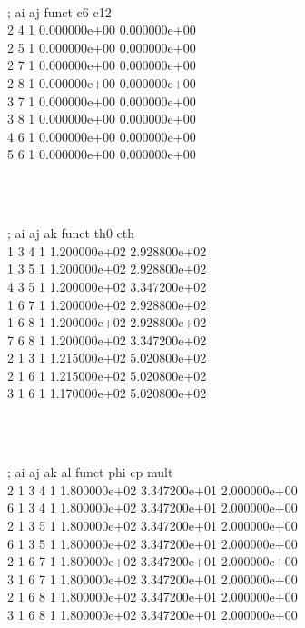 \begin{tt}
[ pairs ]\\
;  ai    aj funct           c6          c12\\
    2     4     1 0.000000e+00 0.000000e+00 \\
    2     5     1 0.000000e+00 0.000000e+00 \\
    2     7     1 0.000000e+00 0.000000e+00 \\
    2     8     1 0.000000e+00 0.000000e+00 \\
    3     7     1 0.000000e+00 0.000000e+00 \\
    3     8     1 0.000000e+00 0.000000e+00 \\
    4     6     1 0.000000e+00 0.000000e+00 \\
    5     6     1 0.000000e+00 0.000000e+00 \\
\end{tt}\\
\begin{tt}
[ angles ]\\
;  ai    aj    ak funct          th0          cth\\
    1     3     4     1 1.200000e+02 2.928800e+02 \\
    1     3     5     1 1.200000e+02 2.928800e+02 \\
    4     3     5     1 1.200000e+02 3.347200e+02 \\
    1     6     7     1 1.200000e+02 2.928800e+02 \\
    1     6     8     1 1.200000e+02 2.928800e+02 \\
    7     6     8     1 1.200000e+02 3.347200e+02 \\
    2     1     3     1 1.215000e+02 5.020800e+02 \\
    2     1     6     1 1.215000e+02 5.020800e+02 \\
    3     1     6     1 1.170000e+02 5.020800e+02 \\
\end{tt}\\
\begin{tt}
[ dihedrals ]\\
;  ai    aj    ak    al funct          phi           cp         mult\\
    2     1     3     4     1 1.800000e+02 3.347200e+01 2.000000e+00 \\
    6     1     3     4     1 1.800000e+02 3.347200e+01 2.000000e+00 \\
    2     1     3     5     1 1.800000e+02 3.347200e+01 2.000000e+00 \\
    6     1     3     5     1 1.800000e+02 3.347200e+01 2.000000e+00 \\
    2     1     6     7     1 1.800000e+02 3.347200e+01 2.000000e+00 \\
    3     1     6     7     1 1.800000e+02 3.347200e+01 2.000000e+00 \\
    2     1     6     8     1 1.800000e+02 3.347200e+01 2.000000e+00 \\
    3     1     6     8     1 1.800000e+02 3.347200e+01 2.000000e+00 \\
\end{tt}\\
